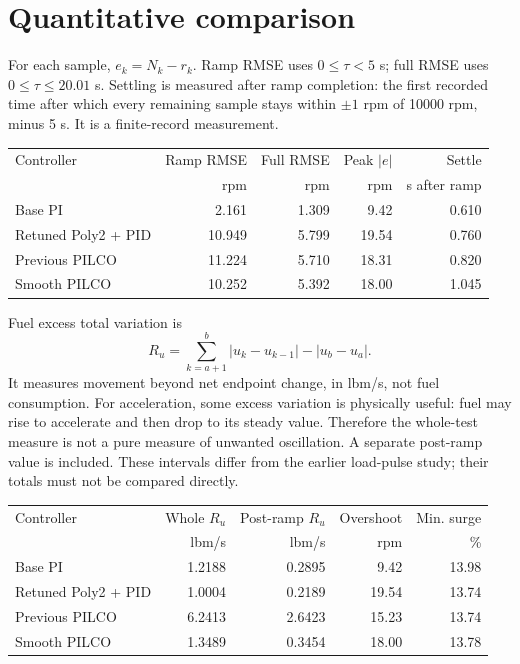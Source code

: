 \section{Quantitative comparison}
For each sample, $e_k=N_k-r_k$. Ramp RMSE uses $0\leq\tau<5$ s; full RMSE uses $0\leq\tau\leq20.01$ s. Settling is measured after ramp completion: the first recorded time after which every remaining sample stays within $\pm1$ rpm of 10000 rpm, minus 5 s. It is a finite-record measurement.
\begin{center}\small\begin{tabular}{lrrrr}\toprule
Controller & Ramp RMSE & Full RMSE & Peak $|e|$ & Settle\\
 & rpm & rpm & rpm & s after ramp\\\midrule
Base PI & 2.161 & 1.309 & 9.42 & 0.610 \\
Retuned Poly2 + PID & 10.949 & 5.799 & 19.54 & 0.760 \\
Previous PILCO & 11.224 & 5.710 & 18.31 & 0.820 \\
Smooth PILCO & 10.252 & 5.392 & 18.00 & 1.045 \\
\bottomrule\end{tabular}\end{center}
Fuel excess total variation is
\begin{equation}R_u=\sum_{k=a+1}^{b}|u_k-u_{k-1}|-|u_b-u_a|.\end{equation}
It measures movement beyond net endpoint change, in lbm/s, not fuel consumption. For acceleration, some excess variation is physically useful: fuel may rise to accelerate and then drop to its steady value. Therefore the whole-test measure is not a pure measure of unwanted oscillation. A separate post-ramp value is included. These intervals differ from the earlier load-pulse study; their totals must not be compared directly.
\begin{center}\small\begin{tabular}{lrrrr}\toprule
Controller & Whole $R_u$ & Post-ramp $R_u$ & Overshoot & Min. surge\\
 & lbm/s & lbm/s & rpm & \%\\\midrule
Base PI & 1.2188 & 0.2895 & 9.42 & 13.98 \\
Retuned Poly2 + PID & 1.0004 & 0.2189 & 19.54 & 13.74 \\
Previous PILCO & 6.2413 & 2.6423 & 15.23 & 13.74 \\
Smooth PILCO & 1.3489 & 0.3454 & 18.00 & 13.78 \\
\bottomrule\end{tabular}\end{center}

